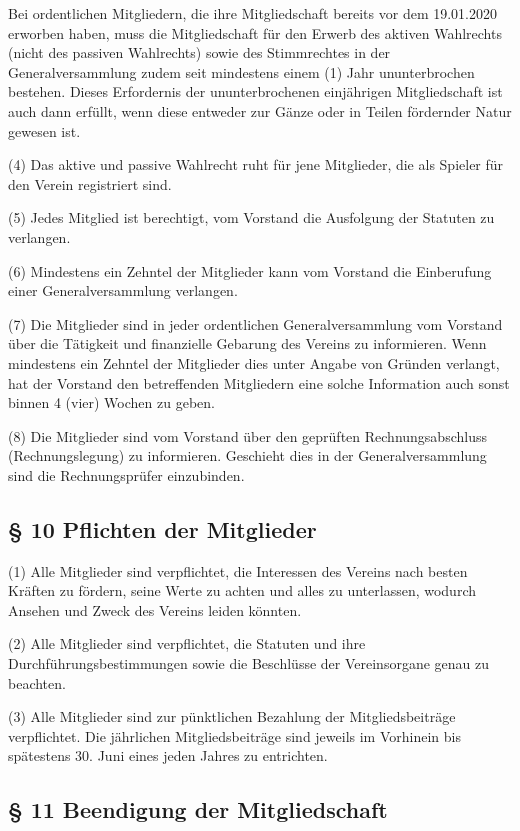 \documentclass[11pt,a4paper]{article}
\begin{document}
Bei ordentlichen Mitgliedern, die ihre Mitgliedschaft bereits vor dem 19.01.2020 erworben haben, muss die Mitgliedschaft für den Erwerb des aktiven Wahlrechts (nicht des passiven Wahlrechts) sowie des Stimmrechtes in der Generalversammlung zudem seit mindestens einem (1) Jahr ununterbrochen bestehen.
Dieses Erfordernis der ununterbrochenen einjährigen Mitgliedschaft ist auch dann erfüllt, wenn diese entweder zur Gänze oder in Teilen fördernder Natur gewesen ist.

(4)
Das aktive und passive Wahlrecht ruht für jene Mitglieder, die als Spieler für den Verein registriert sind.

(5)
Jedes Mitglied ist berechtigt, vom Vorstand die Ausfolgung der Statuten zu verlangen.

(6)
Mindestens ein Zehntel der Mitglieder kann vom Vorstand die Einberufung einer Generalversammlung verlangen.

(7)
Die Mitglieder sind in jeder ordentlichen Generalversammlung vom Vorstand über die Tätigkeit und finanzielle Gebarung des Vereins zu informieren.
Wenn mindestens ein Zehntel der Mitglieder dies unter Angabe von Gründen verlangt, hat der Vorstand den betreffenden Mitgliedern eine solche Information auch sonst binnen 4 (vier) Wochen zu geben.

(8)
Die Mitglieder sind vom Vorstand über den geprüften Rechnungsabschluss (Rechnungslegung) zu informieren.
Geschieht dies in der Generalversammlung sind die Rechnungsprüfer einzubinden.

\subsection{§ 10
Pflichten der Mitglieder}

(1)
Alle Mitglieder sind verpflichtet, die Interessen des Vereins nach besten Kräften zu fördern, seine Werte zu achten und alles zu unterlassen, wodurch Ansehen und Zweck des Vereins leiden könnten.

(2)
Alle Mitglieder sind verpflichtet, die Statuten und ihre Durchführungsbestimmungen sowie die Beschlüsse der Vereinsorgane genau zu beachten.

(3)
Alle Mitglieder sind zur pünktlichen Bezahlung der Mitgliedsbeiträge verpflichtet.
Die jährlichen Mitgliedsbeiträge sind jeweils im Vorhinein bis spätestens 30. Juni eines jeden Jahres zu entrichten.

\subsection{§ 11
Beendigung der Mitgliedschaft}
\end{document}
